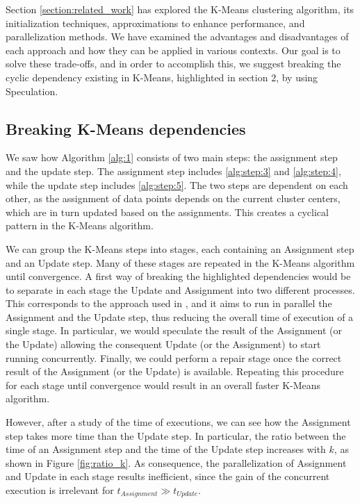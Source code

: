 Section \ref{section:related_work} has explored the K-Means clustering algorithm, its initialization techniques, approximations to enhance performance, and parallelization methods. We have examined the advantages and disadvantages of each approach and how they can be applied in various contexts. Our goal is to solve these trade-offs, and in order to accomplish this, we suggest breaking the cyclic dependency existing in K-Means, highlighted in section 2, by using Speculation. 

\subsection{Breaking K-Means dependencies}
\label{section:breaking_dependencies}
We saw how Algorithm \ref{alg:1} consists of two main steps: the assignment step and the update step. The assignment step includes \ref{alg:step:3} and \ref{alg:step:4}, while the update step includes \ref{alg:step:5}. The two steps are dependent on each other, as the assignment of data points depends on the current cluster centers, which are in turn updated based on the assignments. This creates a cyclical pattern in the K-Means algorithm.

We can group the K-Means steps into stages, each containing an Assignment step and
an Update step. Many of these stages are repeated in the K-Means algorithm until convergence.
A first way of breaking the highlighted dependencies would be to separate in each stage the Update and Assignment into two different processes. This corresponds to the approach used in \cite{Sioulas:282304}, and it aims to run in parallel the Assignment and the Update step, thus reducing the overall time of execution of a single stage. In particular, we would speculate the result of the Assignment (or the Update) allowing the consequent Update (or the Assignment) to start running concurrently. Finally, we could perform a repair stage once the correct result of the Assignment (or the Update) is available. Repeating this procedure for each stage until convergence would result in an overall faster K-Means algorithm.

However, after a study of the time of executions, we can see how the Assignment step takes more time than the Update step. In particular, the ratio between the time of an Assignment step and the time of the Update step increases with $k$, as shown in Figure \ref{fig:ratio_k}. As consequence, the parallelization of Assignment and Update in each stage results inefficient, since the gain of the concurrent execution is irrelevant for $t_{Assignment} \gg t_{Update}$.


